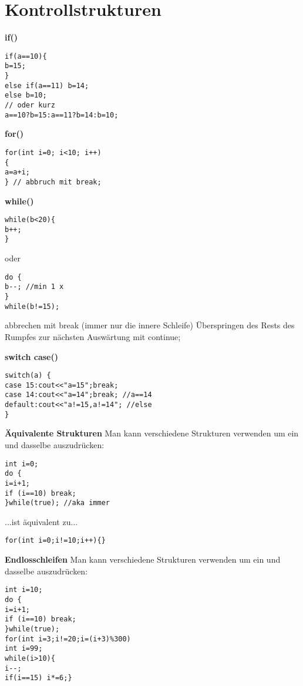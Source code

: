 \section{Kontrollstrukturen}
\textbf{if()}
\begin{lstlisting}
if(a==10){
b=15;
}
else if(a==11) b=14;
else b=10;
// oder kurz
a==10?b=15:a==11?b=14:b=10;
\end{lstlisting}

\textbf{for()}
\begin{lstlisting}
for(int i=0; i<10; i++)
{
a=a+i;
} // abbruch mit break;
\end{lstlisting}

\textbf{while()}
\begin{multicols}{2}
	\begin{lstlisting}
while(b<20){
b++;
}	
	\end{lstlisting}
oder
	\begin{lstlisting}
do {
b--; //min 1 x
}
while(b!=15);
	\end{lstlisting}
\end{multicols}
abbrechen mit break (immer nur die innere Schleife)
Überspringen des Rests des Rumpfes zur nächsten
Auswärtung mit continue;


\textbf{switch case()}
\begin{lstlisting}
switch(a) {
case 15:cout<<"a=15";break;
case 14:cout<<"a=14";break; //a==14
default:cout<<"a!=15,a!=14"; //else
}
\end{lstlisting}

\textbf{Äquivalente Strukturen}
Man kann verschiedene Strukturen verwenden um ein und dasselbe auszudrücken: 
\begin{lstlisting}
int i=0;
do {
i=i+1;
if (i==10) break;
}while(true); //aka immer
\end{lstlisting}
...ist äquivalent zu... 
\begin{lstlisting}
for(int i=0;i!=10;i++){} 
\end{lstlisting}


\textbf{Endlosschleifen}
Man kann verschiedene Strukturen verwenden um ein und dasselbe auszudrücken: 
\begin{lstlisting}
int i=10;
do {
i=i+1;
if (i==10) break;
}while(true);
for(int i=3;i!=20;i=(i+3)%300)
int i=99;
while(i>10){
i--;
if(i==15) i*=6;} 
\end{lstlisting}





